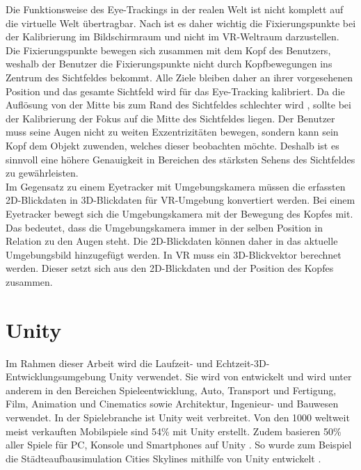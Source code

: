 Die Funktionsweise des Eye-Trackings in der realen Welt ist nicht komplett auf die virtuelle Welt übertragbar. Nach \citeauthor{Clay_Koenig_Koenig_2019} ist es daher wichtig die Fixierungspunkte bei der Kalibrierung im Bildschirmraum und nicht im \ac{VR}-Weltraum darzustellen. Die Fixierungspunkte bewegen sich zusammen mit dem Kopf des Benutzers, weshalb der Benutzer die Fixierungspunkte nicht durch Kopfbewegungen ins Zentrum des Sichtfeldes bekommt. Alle Ziele bleiben daher an ihrer vorgesehenen Position und das gesamte Sichtfeld wird für das Eye-Tracking kalibriert. Da die Auflösung von der Mitte bis zum Rand des Sichtfeldes schlechter wird \cite{Kreylos.2017}, sollte bei der Kalibrierung der Fokus auf die Mitte des Sichtfeldes liegen. Der Benutzer muss seine Augen nicht zu weiten Exzentrizitäten bewegen, sondern kann sein Kopf dem Objekt zuwenden, welches dieser beobachten möchte. Deshalb ist es sinnvoll eine höhere Genauigkeit in Bereichen des stärksten Sehens des Sichtfeldes zu gewährleisten. \cite{Clay_Koenig_Koenig_2019} \\ 
Im Gegensatz zu einem Eyetracker mit Umgebungskamera müssen die erfassten 2D-Blickdaten in 3D-Blickdaten für \ac{VR}-Umgebung konvertiert werden. Bei einem Eyetracker bewegt sich die Umgebungskamera mit der Bewegung des Kopfes mit. Das bedeutet, dass die Umgebungskamera immer in der selben Position in Relation zu den Augen steht. Die 2D-Blickdaten können daher in das aktuelle Umgebungsbild hinzugefügt werden. In \ac{VR} muss ein 3D-Blickvektor berechnet werden. Dieser setzt sich aus den 2D-Blickdaten und der Position des Kopfes zusammen. \cite{Clay_Koenig_Koenig_2019}

\section{Unity}
Im Rahmen dieser Arbeit wird die Laufzeit- \cite{Schwichtenberg.2020} und Echtzeit-3D-Entwicklungsumgebung \cite{Unity.2020} Unity verwendet. Sie wird von \citeauthor{Unity-Facts.2020} entwickelt und wird unter anderem in den Bereichen Spieleentwicklung, Auto, Transport und Fertigung, Film, Animation und Cinematics sowie Architektur, Ingenieur- und Bauwesen verwendet. \cite{Unity.2020} In der Spielebranche ist Unity weit verbreitet. Von den 1000 weltweit meist verkauften Mobilspiele sind 54\% mit Unity erstellt. Zudem basieren 50\% aller Spiele für PC, Konsole und Smartphones auf Unity \cite{Unity-Facts.2020}. So wurde zum Beispiel die Städteaufbausimulation Cities Skylines mithilfe von Unity entwickelt \cite{Cities.2020}.


